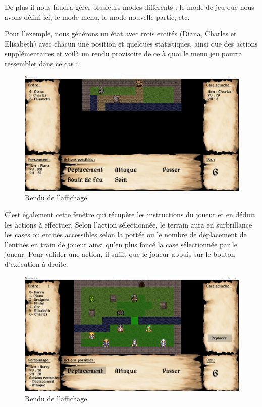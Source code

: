 \documentclass[a4paper,12pt]{article}
\begin{document}
De plus il nous faudra gérer plusieurs modes différents : le mode de jeu que nous avons défini ici, le mode menu, le mode nouvelle partie, etc.

Pour l'exemple, nous générons un état avec trois entités (Diana, Charles et Elisabeth) avec chacun une position et quelques statistiques, ainsi que des actions supplémentaires et voilà un rendu provisoire de ce à quoi le menu jeu pourra ressembler dans ce cas :
\begin{figure}[hbt!]
    \centering
    \includegraphics[width =.8\paperwidth, angle=0]{images/rendu.png}
    \caption{Rendu de l'affichage}
    \label{fig:rendu}
\end{figure}
\newpage


C'est également cette fenêtre qui récupère les instructions du joueur et en déduit les actions à effectuer. Selon l'action sélectionnée, le terrain aura en surbrillance les cases ou entités accessibles selon la portée ou le nombre de déplacement de l'entités en train de joueur ainsi qu'en plus foncé la case sélectionnée par le joueur. Pour valider une action, il suffit que le joueur appuis sur le bouton d'exécution à droite.

\begin{figure}[hbt!]
    \centering
    \includegraphics[width =.8\paperwidth, angle=0]{images/renduFinal.png}
    \caption{Rendu de l'affichage}
    \label{fig:renduF}
\end{figure}
\newpage
\end{document}
